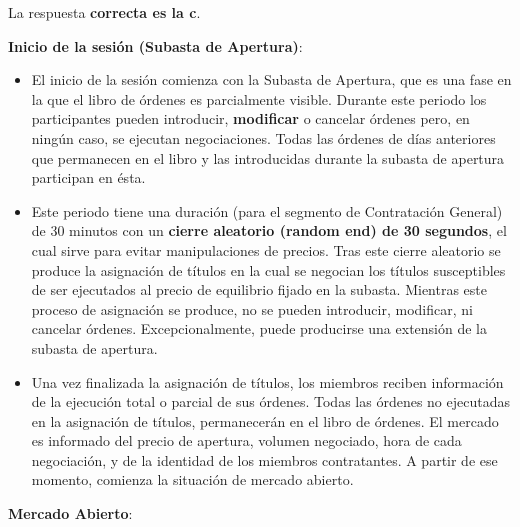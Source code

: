 \documentclass[
  letterpaper,
  DIV=11,
  numbers=noendperiod]{scrreprt}
\begin{document}
\begin{tcolorbox}[enhanced jigsaw, left=2mm, opacityback=0, colback=white, breakable, arc=.35mm, bottomrule=.15mm, rightrule=.15mm, toprule=.15mm, leftrule=.75mm, colframe=quarto-callout-tip-color-frame]
\begin{minipage}[t]{5.5mm}
\textcolor{quarto-callout-tip-color}{\faLightbulb}
\end{minipage}%
\begin{minipage}[t]{\textwidth - 5.5mm}

La respuesta \textbf{correcta es la c}.

\textbf{Inicio de la sesión (Subasta de Apertura)}:

\begin{itemize}
\item
  El inicio de la sesión comienza con la Subasta de Apertura, que es una
  fase en la que el libro de órdenes es parcialmente visible. Durante
  este periodo los participantes pueden introducir, \textbf{modificar} o
  cancelar órdenes pero, en ningún caso, se ejecutan negociaciones.
  Todas las órdenes de días anteriores que permanecen en el libro y las
  introducidas durante la subasta de apertura participan en ésta.
\item
  Este periodo tiene una duración (para el segmento de Contratación
  General) de 30 minutos con un \textbf{cierre aleatorio (random end) de
  30 segundos}, el cual sirve para evitar manipulaciones de precios.
  Tras este cierre aleatorio se produce la asignación de títulos en la
  cual se negocian los títulos susceptibles de ser ejecutados al precio
  de equilibrio fijado en la subasta. Mientras este proceso de
  asignación se produce, no se pueden introducir, modificar, ni cancelar
  órdenes. Excepcionalmente, puede producirse una extensión de la
  subasta de apertura.
\item
  Una vez finalizada la asignación de títulos, los miembros reciben
  información de la ejecución total o parcial de sus órdenes. Todas las
  órdenes no ejecutadas en la asignación de títulos, permanecerán en el
  libro de órdenes. El mercado es informado del precio de apertura,
  volumen negociado, hora de cada negociación, y de la identidad de los
  miembros contratantes. A partir de ese momento, comienza la situación
  de mercado abierto.
\end{itemize}

\textbf{Mercado Abierto}:


\end{minipage}
\end{tcolorbox}
\end{document}
